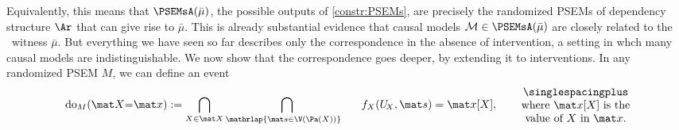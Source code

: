 Equivalently, this means that $\PSEMsA(\bar\mu)$, the possible outputs of \cref{constr:PSEMs}, are precisely the randomized PSEMs 
of dependency structure $\Ar$ that can give rise to $\bar\mu$. 
This is already substantial evidence that causal models $\mathcal M \in \PSEMsA(\bar\mu)$ are closely related to the \scibility\ witness 
$\bar\mu$. But everything we have seen so far describes only the
 correspondence in the absence of intervention, a setting in whch many causal models are indistinguishable.  
We now show that the correspondence goes deeper, by extending it to interventions. 
In any randomized PSEM $M$, we can define an event 
\begin{equation}
    \mathrm{do}_{M}(\mat X{=}\mat x) := 
        \bigcap_{X \in \mat X} \bigcap_{\mathrlap{\mat s \in \V(\Pa(X))}~~}~~~f_X(U_{\!{X}}, \mat s) = \mat x[X],
    \qquad\parbox{3.5cm}{\centering\singlespacingplus
    where $\mat x[X]$ is the value of $X$ in $\mat x$.
    }
\end{equation}
